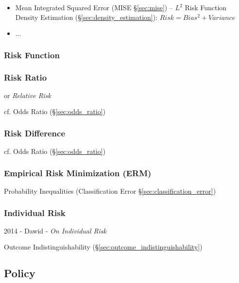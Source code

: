 \begin{itemize}
  \item Mean Integrated Squared Error (MISE \S\ref{sec:mise}) -- $L^2$ Risk
    Function \fist Density Estimation (\S\ref{sec:density_estimation}):
    $Risk = Bias^2 + Variance$
  \item ...
\end{itemize}



\subsubsection{Risk Function}\label{sec:risk_function}

\subsubsection{Risk Ratio}\label{sec:risk_ratio}

or \emph{Relative Risk}

cf. Odds Ratio (\S\ref{sec:odds_ratio})



\subsubsection{Risk Difference}\label{sec:risk_difference}

cf. Odds Ratio (\S\ref{sec:odds_ratio})



\subsubsection{Empirical Risk Minimization (ERM)}\label{sec:erm}

Probability Inequalities (Classification Error \S\ref{sec:classification_error})



\subsubsection{Individual Risk}\label{sec:individual_risk}

2014 - Dawid - \emph{On Individual Risk}

\fist Outcome Indistinguishability (\S\ref{sec:outcome_indistinguishability})



\subsection{Policy}\label{sec:policy}

